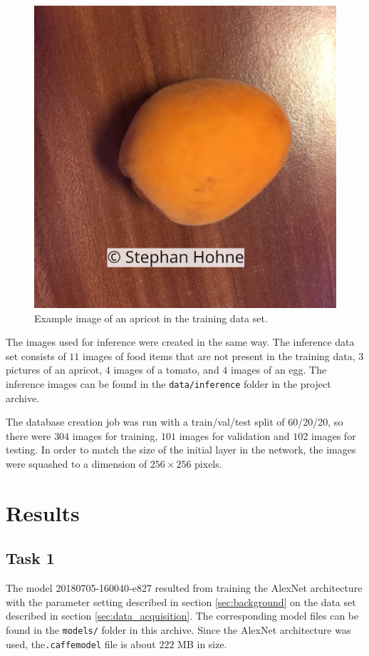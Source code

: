 \documentclass[10pt, journal, compsoc]{IEEEtran}
\newcommand{\an}{AlexNet }
\begin{document}
\begin{figure}[htpb]
      \centering
      \includegraphics[width=\columnwidth]{images/data_samples/IMG_1714.jpg}
      \caption{Example image of an apricot in the training data set.}
      \label{fig:IMG_1714}
\end{figure}

The images used for inference were created in the same way. The inference data set consists of $11$ images of food items that are not present in the training data, $3$ pictures of an apricot, $4$ images of a tomato, and $4$ images of an egg. The inference images can be found in the \texttt{data/inference} folder in the project archive.

The database creation job was run with a train/val/test split of 60/20/20, so there were  $304$ images for training, $101$ images for validation and $102$ images for testing. In order to match the size of the initial layer in the network, the images were squashed to a dimension of $256 \times 256$ pixels.

\section{Results}
\label{sec:results}
\subsection{Task 1}
The model 20180705-160040-e827 resulted from training the \an architecture with the parameter setting described in section \ref{sec:background} on the data set described in section \ref{sec:data_acquisition}. The corresponding model files can be found in the \texttt{models/} folder in this archive. Since the \an architecture was used, the\texttt{.caffemodel} file is about $222$ MB in size.
\end{document}
